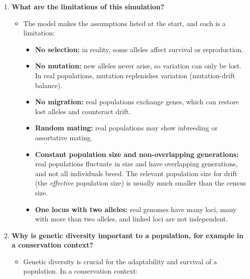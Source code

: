 \documentclass[
  a4paper]{book}
\providecommand{\tightlist}{%
  \setlength{\itemsep}{0pt}\setlength{\parskip}{0pt}}
\begin{document}
\begin{enumerate}
\def\labelenumi{\arabic{enumi}.}
\tightlist
\item
  \textbf{What are the limitations of this simulation?}

  \begin{itemize}
  \tightlist
  \item
    The model makes the assumptions listed at the start, and each is a limitation:

    \begin{itemize}
    \tightlist
    \item
      \textbf{No selection:} in reality, some alleles affect survival or reproduction.
    \item
      \textbf{No mutation:} new alleles never arise, so variation can only be lost. In real populations, mutation replenishes variation (mutation-drift balance).
    \item
      \textbf{No migration:} real populations exchange genes, which can restore lost alleles and counteract drift.
    \item
      \textbf{Random mating:} real populations may show inbreeding or assortative mating.
    \item
      \textbf{Constant population size and non-overlapping generations:} real populations fluctuate in size and have overlapping generations, and not all individuals breed. The relevant population size for drift (the \emph{effective} population size) is usually much smaller than the census size.
    \item
      \textbf{One locus with two alleles:} real genomes have many loci, many with more than two alleles, and linked loci are not independent.
    \end{itemize}
  \end{itemize}
\item
  \textbf{Why is genetic diversity important to a population, for example in a conservation context?}

  \begin{itemize}
  \tightlist
  \item
    Genetic diversity is crucial for the adaptability and survival of a population. In a conservation context:


\end{itemize}
\end{enumerate}
\end{document}
